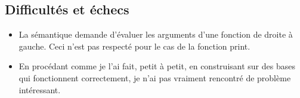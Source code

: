 \documentclass{article}
\begin{document}
\subsection{Difficultés et échecs}
\begin{itemize}
\item La sémantique demande d'évaluer les arguments d'une fonction de droite à gauche. Ceci n'est pas respecté pour le cas de la fonction print.
\item En procédant comme je l'ai fait, petit à petit, en construisant sur des bases qui fonctionnent correctement, je n'ai pas vraiment rencontré de problème intéressant.
\end{itemize}
\end{document}

